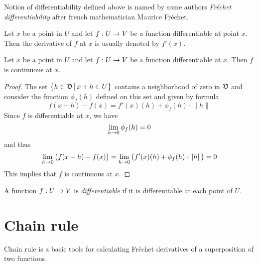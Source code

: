 \begin{remark}\label{remark:Fr{\'e}chet_derivative}
Notion of differentiability defined above is named by some authors \textit{Fr{\'e}chet differentiability} after french mathematician Maurice Fr{\'e}chet.
\end{remark}
    
\begin{remark}\label{remark:notation_for_derivative}
Let $x$ be a point in $U$ and let $f:U\rightarrow V$ be a function differentiable at point $x$. Then the derivative of $f$ at $x$ is usually denoted by $f'(x)$.
\end{remark}

\begin{fact}\label{fact:differentiable_is_continuous}
Let $x$ be a point in $U$ and let $f:U\rightarrow V$ be a function differentiable at $x$. Then $f$ is continuous at $x$.
\end{fact}
\begin{proof}
The set $\big\{h\in {\mathfrak D}\,\big|\,x+h\in U\big\}$ contains a neighborhood of zero in ${\mathfrak D}$ and consider the function $\phi_f(h)$ defined on this set and given by formula 
$$f(x+h) - f(x) = f'(x)(h) + \phi_f(h)\cdot \lVert h \rVert$$
Since $f$ is differentiable at $x$, we have 
$$\lim_{h\rightarrow 0}\phi_f(h) = 0$$
and thus
$$\lim_{h\rightarrow 0}\big(f(x+h) - f(x)\big) = \lim_{h\rightarrow 0}\big(f'(x)(h) + \phi_f(h)\cdot \lVert h \rVert\big) = 0$$
This implies that $f$ is continuous at $x$. 
\end{proof}

\begin{definition}
A function $f:U\rightarrow V$ is \textit{differentiable} if it is differentiable at each point of $U$.
\end{definition}

\section{Chain rule}
\noindent
Chain rule is a basic tools for calculating Fr{\'e}chet derivatives of a superposition of two functions.

